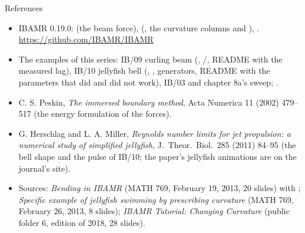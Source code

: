 \documentclass[aspectratio=169,11pt]{beamer}
\begin{document}
\begin{frame}{References}
\label{fr:refs}
\scriptsize
\begin{itemize}
  \item IBAMR 0.19.0:  (the beam force),  (, the curvature columns and ), . \url{https://github.com/IBAMR/IBAMR}
  \item The examples of this series: IB/09 curling beam (, /, README with the measured lag), IB/10 jellyfish bell (, , generators, README with the parameters that did and did not work), IB/03 and chapter 8a's sweep; .
  \item C. S. Peskin, \emph{The immersed boundary method}, Acta Numerica 11 (2002) 479--517 (the energy formulation of the forces).
  \item G. Herschlag and L. A. Miller, \emph{Reynolds number limits for jet propulsion: a numerical study of simplified jellyfish}, J.\ Theor.\ Biol.\ 285 (2011) 84--95 (the bell shape and the pulse of IB/10; the paper's jellyfish animations are on the journal's site).
  \item Sources: \emph{Bending in IBAMR} (MATH 769, February 19, 2013, 20 slides) with ; \emph{Specific example of jellyfish swimming by prescribing curvature} (MATH 769, February 26, 2013, 8 slides); \emph{IBAMR Tutorial: Changing Curvature} (public folder 6, edition of 2018, 28 slides).
\end{itemize}
\end{frame}
\end{document}
